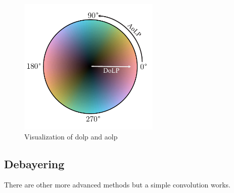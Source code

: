 \begin{figure}[H]
    \centering
    \includegraphics[width=0.6\textwidth]{figures/cmap/aolp_dolp_cmap.pdf}
    \caption{Visualization of \gls{dolp} and \gls{aolp}}
\end{figure}

\subsection*{Debayering}
There are other more advanced methods but a simple convolution works.






